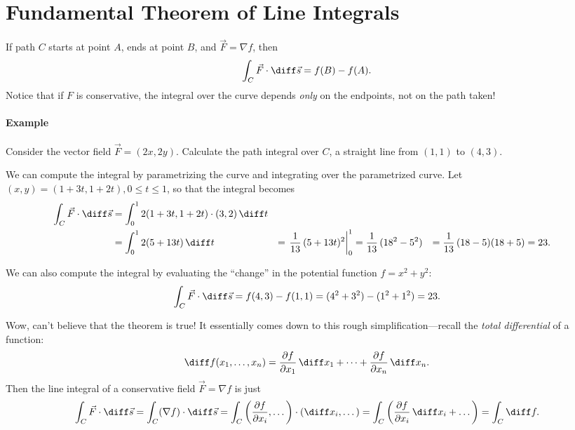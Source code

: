 \documentclass{multi}
\begin{document}
\section*{Fundamental Theorem of Line Integrals}

If path \(C\) starts at point \(A\), ends at point \(B\), and \(\vec F = \nabla
f\), then
\[
    \int_C \vec F \cdot \diff \vec s = f(B) - f(A).
\]
Notice that if \(F\) is conservative, the integral over the curve depends
\emph{only} on the endpoints, not on the path taken!

\paragraph{Example}

Consider the vector field \(\vec F = (2x, 2y)\). Calculate the path integral
over \(C\), a straight line from \((1, 1)\) to \((4, 3)\).

We can compute the integral by parametrizing the curve and integrating over the
parametrized curve. Let \((x, y) = (1+3t, 1+2t), 0 \le t \le 1\), so that the
integral becomes
\begin{align*}
  \int_C \vec F \cdot \diff \vec s &= \int_0^1 2(1+3t, 1+2t) \cdot (3,2)\, \diff t \\
  &= \int_0^1 2(5+13t) \, \diff t
  &= \left.\frac{1}{13} \, (5+13t)^2\right\rvert_0^1
  &= \frac{1}{13} \, (18^2 - 5^2)
  &= \frac{1}{13} \, (18-5)(18+5)
  &= 23.
\end{align*}


We can also compute the integral by evaluating the ``change'' in the potential
function \(f = x^2 + y^2\):
\begin{gather*}
  \int_C \vec F \cdot \diff \vec s = f(4, 3) - f(1, 1) =
  (4^2 + 3^2) - (1^2 + 1^2)
  = 23.
\end{gather*}

Wow, can't believe that the theorem is true! It essentially comes down to this
rough simplification---recall the \emph{total differential} of a function:
\begin{gather*}
  \diff f(x_1, \dots, x_n) = \frac{\partial f}{\partial x_1} \, \diff x_1
  + \dots + \frac{\partial f}{\partial x_n} \, \diff x_n.
\end{gather*}
Then the line integral of a conservative field \(\vec F = \nabla f\) is just
\begin{gather*}
  \int_C \vec F \cdot \diff \vec s =
  \int_C (\nabla f) \cdot \diff \vec s =
  \int_C \left(\frac{\partial f}{\partial x_i}, \dots\right) \cdot (\diff x_i, \dots) =
  \int_C \left(\frac{\partial f}{\partial x_i} \, \diff x_i + \dots\right) =
  \int_C \diff f.
\end{gather*}
\end{document}
